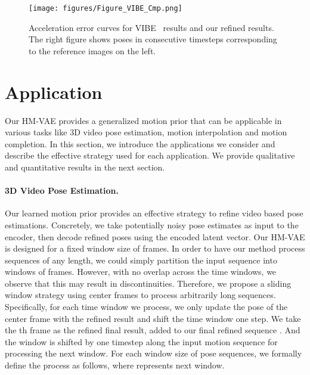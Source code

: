\begin{figure*}[t!]
\vspace{-2mm}
\begin{center}   \texttt{[image: figures/Figure\_VIBE\_Cmp.png]}
\end{center}
\vspace{-5mm}
\caption{Acceleration error curves for VIBE~\cite{kocabas2020vibe} results and our refined results. The right figure shows poses in consecutive timesteps corresponding to the reference images on the left.}
\label{vibe_cmp}
\vspace{-3mm}
\end{figure*}

\section{Application}  \label{sec:application}


Our HM-VAE provides a generalized motion prior that can be applicable in various tasks like 3D video pose estimation, motion interpolation and motion completion. In this section, we introduce the applications we consider and describe the effective strategy used for each application. We provide qualitative and quantitative results in the next section.

\paragraph{3D Video Pose Estimation.}
Our learned motion prior provides an effective strategy to refine video based pose estimations. Concretely, we take potentially noisy pose estimates as input to the encoder, then decode refined poses using the encoded latent vector.
Our HM-VAE is designed for a fixed window size of  frames. In order to have our method process sequences of any length, we could simply partition the input sequence into windows of  frames. However, with no overlap across the time windows, we observe that this may result in discontinuities. 
Therefore, we propose a sliding window strategy using center frames to process arbitrarily long sequences. Specifically, for each time window we process, we only update the pose of the center frame with the refined result and shift the time window one step. We take the th frame  as the refined final result, added to our final refined sequence .
And the window is shifted by one timestep along the input motion sequence for processing the next window.
For each window size of pose sequences, we formally define the process as follows, where  represents next window. 







